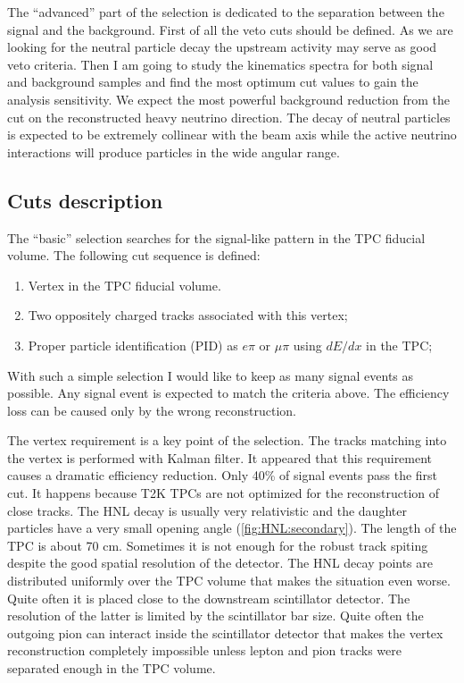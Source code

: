 \documentclass[../main.tex]{subfiles}
\begin{document}
The ``advanced'' part of the selection is dedicated to the separation between the signal and the background. First of all the veto cuts should be defined. As we are looking for the neutral particle decay the upstream activity may serve as good veto criteria. Then I am going to study the kinematics spectra for both signal and background samples and find the most optimum cut values to gain the analysis sensitivity. We expect the most powerful background reduction from the cut on the reconstructed heavy neutrino direction. The decay of neutral particles is expected to be extremely collinear with the beam axis while the active neutrino interactions will produce particles in the wide angular range.

\subsection{Cuts description}
The ``basic'' selection searches for the signal-like pattern in the TPC fiducial volume. The following cut sequence is defined:

\begin{enumerate}
  \item Vertex in the TPC fiducial volume.
  \item Two oppositely charged tracks associated with this vertex;
  \item Proper particle identification (PID) as $e\pi$ or $\mu \pi$ using $dE/dx$ in the TPC;
\end{enumerate}

With such a simple selection I would like to keep as many signal events as possible. Any signal event is expected to match the criteria above. The efficiency loss can be caused only by the wrong reconstruction.

The vertex requirement is a key point of the selection. The tracks matching into the vertex is performed with Kalman filter. It appeared that this requirement causes a dramatic efficiency reduction. Only 40\% of signal events pass the first cut. It happens because T2K TPCs are not optimized for the reconstruction of close tracks. The HNL decay is usually very relativistic and the daughter particles have a very small opening angle (\autoref{fig:HNL:secondary}). The length of the TPC is about 70 cm. Sometimes it is not enough for the robust track spiting despite the good spatial resolution of the detector. The HNL decay points are distributed uniformly over the TPC volume that makes the situation even worse. Quite often it is placed close to the downstream scintillator detector. The resolution of the latter is limited by the scintillator bar size. Quite often the outgoing pion can interact inside the scintillator detector that makes the vertex reconstruction completely impossible unless lepton and pion tracks were separated enough in the TPC volume.
\end{document}
